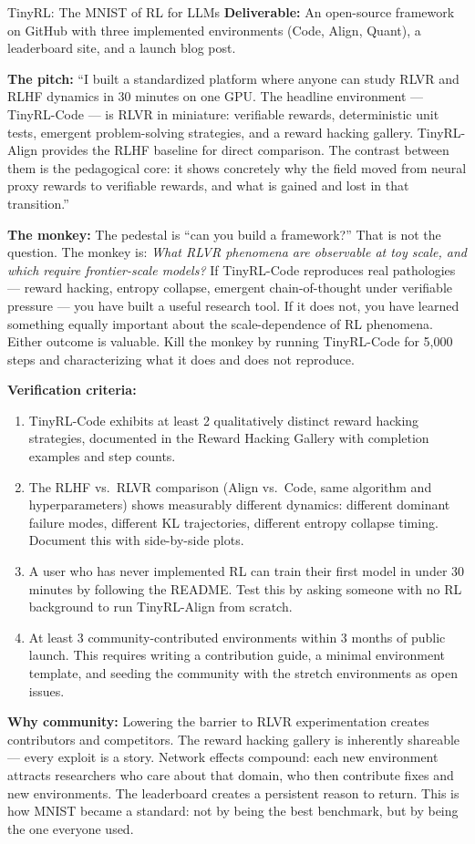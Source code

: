 \begin{portfolio}{TinyRL: The MNIST of RL for LLMs}
\textbf{Deliverable:} An open-source framework on GitHub with three implemented environments (Code, Align, Quant), a leaderboard site, and a launch blog post.

\textbf{The pitch:} ``I built a standardized platform where anyone can study RLVR and RLHF dynamics in 30 minutes on one GPU. The headline environment --- TinyRL-Code --- is RLVR in miniature: verifiable rewards, deterministic unit tests, emergent problem-solving strategies, and a reward hacking gallery. TinyRL-Align provides the RLHF baseline for direct comparison. The contrast between them is the pedagogical core: it shows concretely why the field moved from neural proxy rewards to verifiable rewards, and what is gained and lost in that transition.''

\textbf{The monkey:} The pedestal is ``can you build a framework?'' That is not the question. The monkey is: \textit{What RLVR phenomena are observable at toy scale, and which require frontier-scale models?} If TinyRL-Code reproduces real pathologies --- reward hacking, entropy collapse, emergent chain-of-thought under verifiable pressure --- you have built a useful research tool. If it does not, you have learned something equally important about the scale-dependence of RL phenomena. Either outcome is valuable. Kill the monkey by running TinyRL-Code for 5{,}000 steps and characterizing what it does and does not reproduce.

\textbf{Verification criteria:}
\begin{enumerate}
  \item TinyRL-Code exhibits at least 2 qualitatively distinct reward hacking strategies, documented in the Reward Hacking Gallery with completion examples and step counts.
  \item The RLHF vs.\ RLVR comparison (Align vs.\ Code, same algorithm and hyperparameters) shows measurably different dynamics: different dominant failure modes, different KL trajectories, different entropy collapse timing. Document this with side-by-side plots.
  \item A user who has never implemented RL can train their first model in under 30 minutes by following the README. Test this by asking someone with no RL background to run TinyRL-Align from scratch.
  \item At least 3 community-contributed environments within 3 months of public launch. This requires writing a contribution guide, a minimal environment template, and seeding the community with the stretch environments as open issues.
\end{enumerate}

\textbf{Why community:} Lowering the barrier to RLVR experimentation creates contributors and competitors. The reward hacking gallery is inherently shareable --- every exploit is a story. Network effects compound: each new environment attracts researchers who care about that domain, who then contribute fixes and new environments. The leaderboard creates a persistent reason to return. This is how MNIST became a standard: not by being the best benchmark, but by being the one everyone used.
\end{portfolio}

